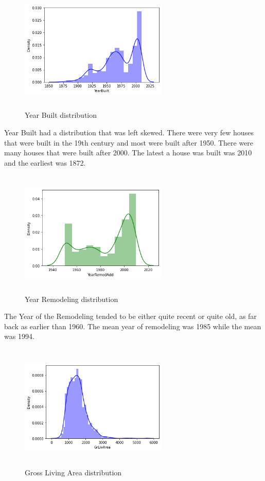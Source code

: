 \documentclass[fleqn,10pt]{SelfArx} %
\begin{document}
\begin{figure}[H]
    \centering
    \includegraphics[width=7cm, height=6cm]{img/yrbthist.png}
    \caption{Year Built distribution}
    \label{fig:my_label}
\end{figure}
Year Built had a distribution that was left skewed. There were very few houses that were built in the 19th century and most were built after 1950. There were many houses that were built after 2000. The latest a house was built was 2010 and the earliest was 1872. 
\begin{figure}[H]
    \centering
    \includegraphics[width=7cm, height=6cm]{img/YearRemodhist.png}
    \caption{Year Remodeling distribution}
    \label{fig:my_label}
\end{figure}
The Year of the Remodeling tended to be either quite recent or quite old, as far back as earlier than 1960. The mean year of remodeling was 1985 while the mean was 1994. 
\begin{figure}[H]
    \centering
    \includegraphics[width=7cm, height=6cm]{img/GriLivAreahis.png}
    \caption{Gross Living Area distribution}
    \label{fig:my_label}
\end{figure}
\end{document}
